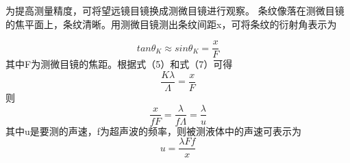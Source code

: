 \documentclass[12pt,a4paper,UTF8]{ctexart}
\begin{document}
\begin{figure}[htbp]
	\centering
	\caption{}
	\label{fig:tcvi}
\end{figure}

为提高测量精度，可将望远镜目镜换成测微目镜进行观察。
条纹像落在测微目镜的焦平面上，条纹清晰。用测微目镜测出条纹间距x，可将条纹的衍射角表示为

\begin{equation}
	tan \theta_K\approx sin\theta_K=\frac{x}{F}
\end{equation}
其中F为测微目镜的焦距。根据式（5）和式（7）可得
\begin{equation}
	\frac{K\lambda}{\varLambda }=\frac{x}{F}
\end{equation}
则
\begin{equation}
	\frac{x}{fF}=\frac{\lambda}{f\varLambda}=\frac{\lambda}{u}
\end{equation}
其中u是要测的声速，f为超声波的频率，则被测液体中的声速可表示为
\begin{equation}
	u=\frac{\lambda F f}{x}
\end{equation}
\end{document}
